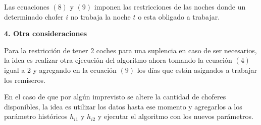 \documentclass[12pt]{article}
\begin{document}
Las ecuaciones $(8)$ y $(9)$ imponen las restricciones de las noches donde un determinado chofer $i$ no trabaja la noche $t$ o esta obligado a trabajar.

{\large\textbf{4. Otra consideraciones}}

Para la restricción de tener 2 coches para una suplencia en caso de ser necesarios, la idea es realizar otra ejecución del algoritmo ahora tomando la ecuación $(4)$ igual a 2 y agregando en la ecuación $(9)$ los días que están asignados a trabajar los remiseros.

En el caso de que por algún imprevisto se altere la cantidad de choferes disponibles, la idea es utilizar los datos hasta ese momento y agregarlos a los parámetro históricos $h_{i1}$ y $h_{i2}$ y ejecutar el algoritmo con los nuevos parámetros.
\end{document}
